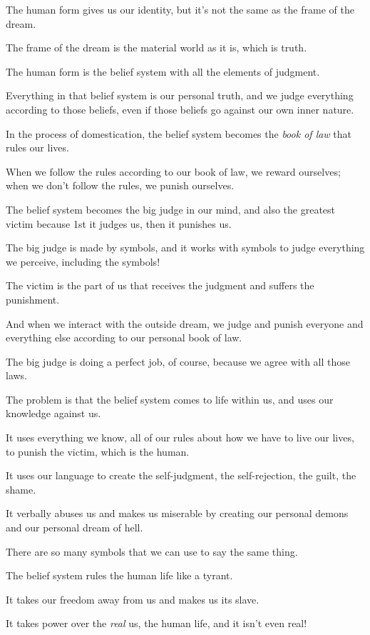 \documentclass{article}
\numberwithin{equation}{section}
\begin{document}
The human form gives us our identity, but it's not the same as the frame of the dream.

The frame of the dream is the material world as it is, which is truth.

The human form is the belief system with all the elements of judgment.

Everything in that belief system is our personal truth, and we judge everything according to those beliefs, even if those beliefs go against our own inner nature.

%
In the process of domestication, the belief system becomes the \textit{book of law} that rules our lives.

When we follow the rules according to our book of law, we reward ourselves; when we don't follow the rules, we punish ourselves.

The belief system becomes the big judge in our mind, and also the greatest victim because 1st it judges us, then it punishes us.

The big judge is made by symbols, and it works with symbols to judge everything we perceive, including the symbols!

The victim is the part of us that receives the judgment and suffers the punishment.

And when we interact with the outside dream, we judge and punish everyone and everything else according to our personal book of law.

%
The big judge is doing a perfect job, of course, because we agree with all those laws.

The problem is that the belief system comes to life within us, and uses our knowledge against us.

It uses everything we know, all of our rules about how we have to live our lives, to punish the victim, which is the human.

It uses our language to create the self-judgment, the self-rejection, the guilt, the shame.

It verbally abuses us and makes us miserable by creating our personal demons and our personal dream of hell.

There are so many symbols that we can use to say the same thing.

%
The belief system rules the human life like a tyrant.

It takes our freedom away from us and makes us its slave.

It takes power over the \textit{real} us, the human life, and it isn't even real!
\end{document}
